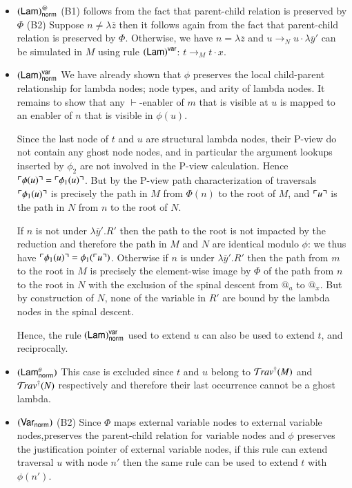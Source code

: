 \documentclass{elsarticle}
\theoremstyle{plain}
\theoremstyle{definition}
\theoremstyle{remark}
\newcommand{\ghostvar}{\theta}
\newcommand{\normalizing}{{\sf norm}}
\newcommand{\enables}{\vdash} %
\begin{document}
\begin{description}[itemindent=0em,leftmargin=0cm]
\begin{itemize}[itemindent=0.5em, leftmargin=0.5em]
    \item $\rulename{Lam}^@_\normalizing$
    (B1) follows from the fact that parent-child relation is preserved by $\Phi$
    (B2) Suppose $n \neq \lambda\overline{z}$ then it follows again from the fact that parent-child relation is preserved by $\Phi$.
    Otherwise, we have $n = \lambda\overline{z}$ and $u \rightarrow_N u \cdot \lambda\overline{y}'$ can be simulated in $M$ using rule $\mathbf{({\sf Lam})}^{\sf var}$: $t \rightarrow_M t \cdot x$.

    \item $\rulename{Lam}^{\sf var}_\normalizing$
    We have already shown that  $\phi$ preserves the local child-parent relationship for lambda nodes; node types, and arity of lambda nodes.
    It remains to show that any $\enables$-enabler of $m$ that is visible at  $u$ is mapped to an enabler of $n$ that is visible in $\phi(u)$.

    Since the last node of $t$ and $u$ are structural lambda nodes, their P-view do not contain any ghost node nodes, and in particular the argument lookups inserted by $\phi_2$ are not involved in the P-view calculation. Hence $\ulcorner \phi(u) \urcorner = \ulcorner \phi_1(u) \urcorner$.
    But by the P-view path characterization of traversals $\ulcorner \phi_1(u) \urcorner$ is precisely the path in $M$ from $\Phi(n)$ to the root of $M$,
    and $\ulcorner u \urcorner$ is the path in $N$ from $n$ to the root of $N$.

    If $n$ is not under $\lambda\overline{y}'.R'$ then the path to the root is not impacted by the reduction and therefore the path in $M$ and $N$ are identical modulo $\phi$: we thus have $\ulcorner \phi_1(u) \urcorner = \phi_1(\ulcorner u \urcorner)$.
    Otherwise if $n$ is under $\lambda\overline{y}'.R'$ then the path from $m$ to the root in $M$ is precisely the element-wise image by $\Phi$ of the path from $n$ to the root in $N$ with the exclusion of the spinal descent from $@_a$ to $@_x$. But by construction of $N$, none of the variable in $R'$ are bound by the lambda nodes in the spinal descent.

    Hence, the rule $\rulename{Lam}^{\sf var}_\normalizing$ used to extend  $u$ can also be used to extend $t$, and reciprocally.

    \item $\rulename{Lam^\ghostvar_\normalizing}$
    This case is excluded since $t$ and $u$ belong to $\mathcal{T}\!rav^\dagger(M)$ and
    $\mathcal{T}\!rav^\dagger(N)$ respectively and therefore their last occurrence cannot be a ghost lambda.

    \item $\rulename{Var_\normalizing}$
    (B2) Since $\Phi$ maps external variable nodes to external variable nodes,preserves the parent-child relation for variable nodes and $\phi$ preserves the justification pointer of external variable nodes, if this rule can extend traversal $u$ with node $n'$ then the same rule can be used to extend $t$ with $\phi(n')$.


\end{itemize}
\end{description}
\end{document}
